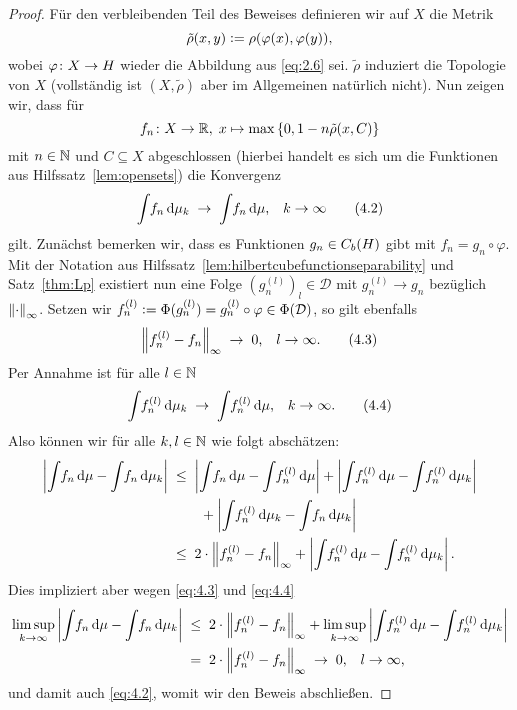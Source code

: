 \documentclass[../main/main.tex]{subfiles}
\begin{document}
\begin{proof}
		Für den verbleibenden Teil des Beweises definieren wir auf $X$ die Metrik
		\[ \tilde{\rho}(x, y) \vcentcolon = \rho(\varphi(x), \varphi(y)) \text{,} \]
		wobei $\varphi \colon X \to H$ wieder die Abbildung aus \eqref{eq:2.6} sei. 
		$\tilde{\rho}$ induziert die Topologie von $X$ (vollständig ist $(X, \tilde{\rho})$ 
		aber im Allgemeinen natürlich nicht). Nun zeigen wir, dass für 
		\[f_n \colon X \to \mathbb{R}, \; x \mapsto \max \left\{0, 1-n \tilde{\rho}(x, C)\right\} \] 
		mit $n \in \mathbb{N}$ und $C \subseteq X$ abgeschlossen (hierbei handelt es sich 
		um die Funktionen aus Hilfssatz~\ref{lem:opensets}) die Konvergenz
		\[ \int_{} \, f_n \, \mathrm{d}\mu_k \; \to \; \int_{} \, f_n \, \mathrm{d}\mu \text{,} 
		\quad k \to \infty \label{eq:4.2} \tag{4.2}\]
		gilt. Zunächst bemerken wir, dass es Funktionen $g_n \in C_b(H)$ 
		gibt mit $f_n = g_n \circ \varphi$. Mit der Notation aus 
		Hilfssatz~\ref{lem:hilbertcubefunctionseparability} und Satz~\ref{thm:Lp} 
		existiert nun eine Folge $(g_n^{(l)})_l \in \mathcal{D}$ mit $g_n^{(l)} \to g_n$ 
		bezüglich $\left\lVert\cdot\right\rVert_\infty$. Setzen wir 
		$f_n^{(l)} \vcentcolon = \Phi(g_n^{(l)}) = g_n^{(l)} \circ \varphi \in \Phi(\mathcal{D})$, 
		so gilt ebenfalls
		\[ \left\lVert f_n^{(l)} - f_n\right\rVert_\infty \; \to \; 0 \text{,} 
		\quad l \to \infty \text{.} \label{eq:4.3} \tag{4.3} \]
		Per Annahme ist für alle $l \in \mathbb{N}$
		\[ \int_{} \, f_n^{(l)} \, \mathrm{d}\mu_k \; \to \; \int_{} \, f_n^{(l)} \, \mathrm{d}\mu \text{,} 
		\quad k \to \infty \text{.} \label{eq:4.4} \tag{4.4} \]
		Also können wir für alle $k, l \in \mathbb{N}$ wie folgt abschätzen:
		\begin{align*}
			\left| \int_{} \, f_n \, \mathrm{d}\mu - \int_{} \, f_n \, \mathrm{d}\mu_k \right| \; &\leq \; 
			\left| \int_{} \, f_n \, \mathrm{d}\mu - \int_{} \, f_n^{(l)} \, \mathrm{d}\mu \right| + 
			\left| \int_{} \, f_n^{(l)} \, \mathrm{d}\mu - \int_{} \, f_n^{(l)} \, \mathrm{d}\mu_k \right| \\
			& \qquad + 
			\left| \int_{} \, f_n^{(l)} \, \mathrm{d}\mu_k - \int_{} \, f_n \, \mathrm{d}\mu_k \right| \\
			&\leq \; 2 \cdot \left\lVert f_n^{(l)} - f_n\right\rVert_\infty + \left| \int_{} \, f_n^{(l)} \, \mathrm{d}\mu - 
			\int_{} \, f_n^{(l)} \, \mathrm{d}\mu_k \right| \text{.}
		\end{align*}
		Dies impliziert aber wegen \eqref{eq:4.3} und \eqref{eq:4.4}
		\begin{align*}
			\limsup_{k \to \infty} \left| \int_{} \, f_n \, \mathrm{d}\mu - 
			\int_{} \, f_n \, \mathrm{d}\mu_k \right|
			\; &\leq \; 2 \cdot \left\lVert f_n^{(l)} - f_n\right\rVert_\infty + 
			\limsup_{k \to \infty} \left| \int_{} \, f_n^{(l)} \, \mathrm{d}\mu - 
			\int_{} \, f_n^{(l)} \, \mathrm{d}\mu_k \right| \\
			&= \; 2 \cdot \left\lVert f_n^{(l)} - f_n\right\rVert_\infty \; \to \; 0 \text{,} 
			\quad l \to \infty \text{,}
		\end{align*}
		und damit auch \eqref{eq:4.2}, womit wir den Beweis abschließen.
	\end{proof}
\end{document}
